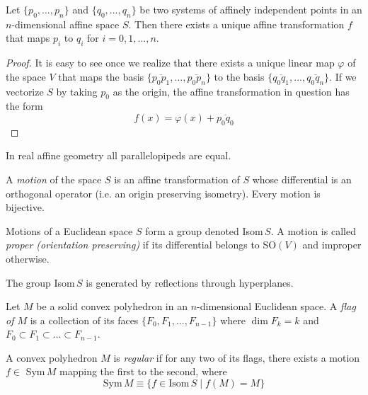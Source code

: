 \documentclass{article}
\begin{document}
    \begin{theorem}
    Let $\{p_0, ..., p_n\}$ and $\{q_0, ..., q_n\}$ be two systems of affinely independent points in an $n$-dimensional affine space $S$. Then there exists a unique affine transformation $f$ that maps $p_i$ to $q_i$ for $i = 0, 1, ..., n$. 
    \end{theorem}
    \begin{proof}
    It is easy to see once we realize that there exists a unique linear map $\varphi$ of the space $V$ that maps the basis $\{\overline{p_0 p_1}, ..., \overline{p_0 p_n}\}$ to the basis $\{\overline{q_0 q_1}, ..., \overline{q_0 q_n}\}$. If we vectorize $S$ by taking $p_0$ as the origin, the affine transformation in question has the form 
    \[f(x) = \varphi(x) + \overline{p_0 q_0}\]
    \end{proof}

    \begin{corollary}
    In real affine geometry all parallelopipeds are equal. 
    \end{corollary}

    \begin{definition}
    A \textit{motion} of the space $S$ is an affine transformation of $S$ whose differential is an orthogonal operator (i.e. an origin preserving isometry). Every motion is bijective. 
    \end{definition}

    Motions of a Euclidean space $S$ form a group denoted Isom$\,S$. A motion is called \textit{proper (orientation preserving)} if its differential belongs to SO$(V)$ and improper otherwise. 

    \begin{lemma}
    The group Isom$\,S$ is generated by reflections through hyperplanes. 
    \end{lemma}

    \begin{definition}
    Let $M$ be a solid convex polyhedron in an $n$-dimensional Euclidean space. A \textit{flag of $M$} is a collection of its faces $\{F_0, F_1, ..., F_{n-1}\}$ where $\dim{F_k} = k$ and $F_0 \subset F_1 \subset ... \subset F_{n-1}$. 
    \end{definition}

    \begin{definition}
    A convex polyhedron $M$ is \textit{regular} if for any two of its flags, there exists a motion $f \in$ Sym$\,M$ mapping the first to the second, where 
    \[\text{Sym}\,M \equiv \{f \in \text{Isom}\,S \;|\; f(M) = M \}\]
    \end{definition}
\end{document}
